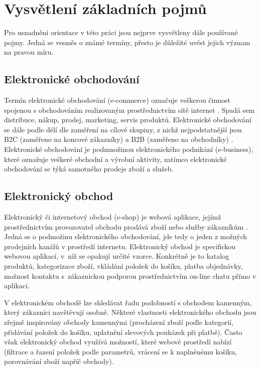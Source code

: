 \documentclass[FM,DP]{tulthesis}
\begin{document}
\section{Vysvětlení základních pojmů}

Pro usnadnění orientace v této práci jsou nejprve vysvětleny dále používané pojmy. Jedná se 
vesměs o známé termíny, přesto je důležité uvést jejich význam na pravou míru.

\subsection*{Elektronické obchodování}

Termín elektronické obchodování (e-commerce) označuje veškerou činnost spojenou s obchodováním
realizovaným prostřednictvím sítě internet \cite[strana~11]{e-commerce}. Spadá sem distribuce, nákup, 
prodej, marketing, servis produktů. Elektronické obchodování se dále podle dělí dle zaměření na cílové 
skupiny, z nichž nejpodstatnější jsou B2C (zaměřeno na koncové zákazníky) a B2B (zaměřeno na obchodníky) 
\cite[strana~17]{e-commerce}. Elektronické obchodování je podmnožinou 
elektronického podnikání (e-business), které oznažuje veškeré obchodní a výrobní aktivity, 
zatímco elektronické obchodování se týká samotného prodeje zboží a služeb.

\subsection*{Elektronický obchod}

Elektronický či internetový obchod (e-shop) je webová aplikace, jejímž prostřednictvím 
provozovatel obchodu prodává zboží nebo služby zákazníkům \cite[strana~16]{e-commerce}.
Jedná se o podmožinu elektronického obchodování, jde tedy o jeden z možných prodejních 
kanálů v prostředí internetu. Elektronický obchod je specifickou webovou aplikací, v~níž 
se opakují určité vzorce. Konkrétně je to katalog produktů, kategorizace zboží, 
vkládání položek do košíku, platba objednávky, možnost kontaktu s~zákaznickou podporou 
prostřednictvím on-line chatu přímo v aplikaci.

V elektronickém obchodě lze shledávat řadu podobností s obchodem kamenným, který zákazníci 
navštěvují osobně. Některé vlastnosti elektronického obchodu jsou zřejmě inspirovány 
obchody kamennými (procházení zboží podle kategorií, přidávání položek do košíku, 
uplatnění slevových poukázek při platbě). Často však elektronický obchod využívá možností, 
které webové prostředí nabízí (filtrace a řazení položek podle parametrů, vrácení se
k naplněnému košíku, porovnávání zboží napříč obchody).
\end{document}
